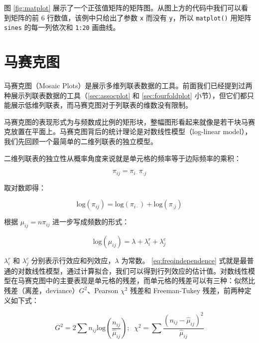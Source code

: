 \documentclass[
  b5paper,
  UTF8,twoside]{book}
\begin{document}
图 \ref{fig:matplot}
展示了一个正弦值矩阵的矩阵图。从图上方的代码中我们可以看到矩阵的前 6 行数值，该例中只给出了参数 \texttt{x} 而没有 \texttt{y}，所以 \texttt{matplot()} 用矩阵 \texttt{sines} 的每一列依次和 \texttt{1:20} 画曲线。

\section{马赛克图}\label{sec:mosaicplot}

马赛克图（Mosaic Plots）是展示多维列联表数据的工具。前面我们已经提到过两种展示列联表数据的工具（\ref{sec:assocplot} 和 \ref{sec:fourfoldplot} 小节），但它们都只能展示低维列联表，而马赛克图对于列联表的维数没有限制。

马赛克图的表现形式为与频数成比例的矩形块，整幅图形看起来就像是若干块马赛克放置在平面上。马赛克图背后的统计理论是对数线性模型（log-linear model），我们先回顾一个最简单的二维列联表的独立模型。

二维列联表的独立性从概率角度来说就是单元格的频率等于边际频率的乘积：

\begin{equation}
\pi_{ij}=\pi_{i\cdot}\pi_{\cdot j}
\label{eq:independence}
\end{equation}

取对数即得：

\begin{equation}
\mathrm{log}(\pi_{ij})=\mathrm{log}(\pi_{i\cdot})+\mathrm{log}(\pi_{\cdot j})
\label{eq:logindependence}
\end{equation}

根据 \(\mu_{ij}=n\pi_{ij}\) 进一步写成频数的形式：

\begin{equation}
\mathrm{log}(\mu_{ij})=\lambda+\lambda_{i}^{r}+\lambda_{j}^{c}
\label{eq:freqindependence}
\end{equation}

\(\lambda_{i}^{r}\) 和 \(\lambda_{j}^{c}\) 分别表示行效应和列效应，\(\lambda\) 为常数。 \eqref{eq:freqindependence} 式就是最普通的对数线性模型，通过计算拟合，我们可以得到行列效应的估计值。对数线性模型在马赛克图中的主要表现是单元格的残差，而单元格的残差可以有三种：似然比残差（离差，deviance）\(G^{2}\)、Pearson \(\chi^{2}\) 残差和 Freeman-Tukey 残差，前两种定义如下式：

\begin{equation}
G^{2}=2\sum n_{ij}\mathrm{log}(\frac{n_{ij}}{\hat{\mu}_{ij}});\;\;\chi^{2}=\sum\frac{\left(n_{ij}-\hat{\mu}_{ij}\right)^{2}}{\hat{\mu}_{ij}}
\label{eq:loglinearres}
\end{equation}
\end{document}
